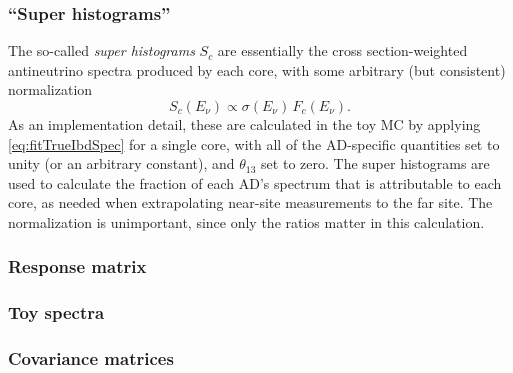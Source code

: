 \documentclass[../thesis.tex]{subfiles}
\begin{document}
\subsubsection{``Super histograms''}

The so-called \emph{super histograms} $S_c$ are essentially the cross section-weighted antineutrino spectra produced by each core, with some arbitrary (but consistent) normalization
\begin{equation*}
  S_c(E_\nu) \propto \sigma(E_\nu)\,F_c(E_\nu).
\end{equation*}
As an implementation detail, these are calculated in the toy MC by applying \autoref{eq:fitTrueIbdSpec} for a single core, with all of the AD-specific quantities set to unity (or an arbitrary constant), and $\theta_{13}$ set to zero. The super histograms are used to calculate the fraction of each AD's spectrum that is attributable to each core, as needed when extrapolating near-site measurements to the far site. The normalization is unimportant, since only the ratios matter in this calculation.
\subsubsection{Response matrix}

\subsubsection{Toy spectra}

\subsubsection{Covariance matrices}
\end{document}
